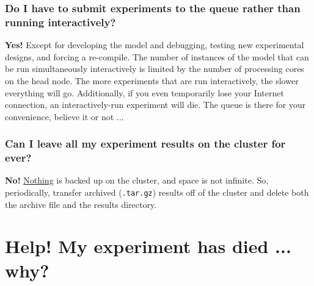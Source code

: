 \documentclass[11pt,fleqn]{book} %
\begin{document}
%
\subsubsection{Do I have to submit experiments to the queue rather than running interactively?}

\textbf{Yes!} Except for developing the model and debugging, testing new experimental designs, and forcing a re-compile. The number of instances of the model that can be run simultaneously interactively is limited by the number of processing cores on the head node. The more experiments that are run interactively, the slower everything will go. Additionally, if you even temporarily lose your Internet connection, an interactively-run experiment will die. The queue is there for your convenience, believe it or not ...

\subsubsection{Can I leave all my experiment results on the cluster for ever?}

\textbf{No!} \uline{Nothing} is backed up on the cluster, and space is not infinite. So, periodically, transfer archived (\texttt{.tar.gz}) results off of the cluster and delete both the archive file and the results directory.


\newpage


\section{Help! My experiment has died ... why?}

%
\end{document}
